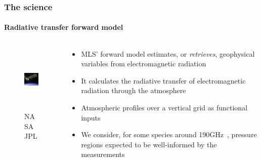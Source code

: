 \documentclass{snedecorbeamer}
\newcommand{\citep}[1]{}
\begin{document}
\begin{frame}[c]
  \frametitle{The science}
  \framesubtitle{Radiative transfer forward model}

  \begin{columns}[c]
    \begin{column}{0.2\textwidth}
      \begin{figure}
        \centering
        \includegraphics[height=8.5em]{inc/mls_aura}
        \caption*{
          \href{https://www.jpl.nasa.gov/missions/microwave-limb-sounder-mls}{}
          NASA JPL}
      \end{figure}
    \end{column}
    \begin{column}{0.7\textwidth}
      \begin{itemize}
      \item MLS' forward model estimates, or \emph{retrieves}, geophysical
        variables from electromagnetic radiation
      \item It calculates the radiative transfer of electromagnetic radiation
        through the atmosphere~\cite{read2006,schwartz2006}
      \item Atmospheric profiles over a vertical grid as functional inputs
      \item We consider, for some species around 190GHz~\cite{waters2006},
        pressure regions expected to be well-informed by the
        measurements~\cite{liversey2020}
      \end{itemize}
    \end{column}
  \end{columns}
\end{frame}
\end{document}
